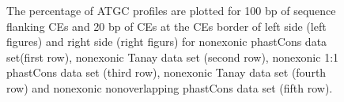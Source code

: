 \documentclass[12pt]{report}
\begin{document}
\begin{figure}[htbp]
\centering
{}
\caption{The percentage of ATGC profiles are plotted for 100 bp of sequence flanking CEs and 20 bp of CEs at the CEs border of left side (left figures) and  right side (right figurs) for nonexonic phastCons data set(first row), nonexonic Tanay data set (second row), nonexonic 1:1 phastCons data set (third row), nonexonic Tanay data set (fourth row) and nonexonic nonoverlapping phastCons data set (fifth row).}
\label{fig:aligned_all}
\end{figure}

\newpage 


\end{document}
